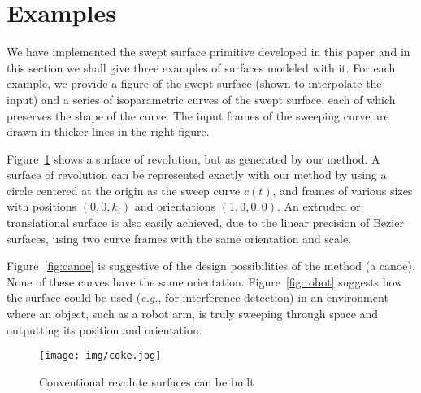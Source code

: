\documentclass[times]{article}
\begin{document}
\section{Examples}
\label{sec:eg}

We have implemented the swept surface primitive developed in this paper
and in this section we shall give three examples of surfaces modeled with it.
For each example, we provide a figure of the
swept surface (shown to interpolate the input)
and a series of isoparametric curves of the swept surface,
each of which preserves the shape of the curve.
The input frames of the sweeping curve are drawn in thicker lines in the 
right figure.

Figure~\ref{fig:coke} shows a surface of revolution, but as generated
by our method.
A surface of revolution can be represented exactly with our method
by using a circle 
centered at the origin
as the sweep curve $c(t)$, and frames of various sizes with positions
$(0,0,k_i)$ and orientations $(1,0,0,0)$.
An extruded  or translational surface is also easily achieved, due to
the linear precision of Bezier surfaces, using two curve frames
with the same orientation and scale.

Figure~\ref{fig:canoe} is suggestive of the design
possibilities of the method (a canoe).
None of these curves have the same orientation.
Figure~\ref{fig:robot} suggests how the surface could be used ({\em e.g.}, for 
interference detection) in an environment
where an object, such as a robot arm, is truly sweeping through space
and outputting its position and orientation.

\begin{figure}
\begin{center}
\texttt{[image: img/coke.jpg]}
\end{center}
\caption{Conventional revolute surfaces can be built}
\label{fig:coke}
\end{figure}

\end{document}
